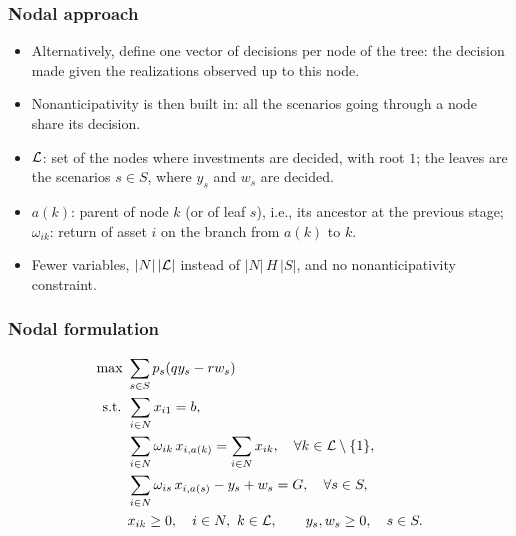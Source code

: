 \documentclass[aspectratio=169]{beamer}
\begin{document}
\begin{frame}
\frametitle{Nodal approach}

\begin{itemize}
\item
Alternatively, define one vector of decisions per node of the tree: the decision made given the realizations observed up to this node.
\item
Nonanticipativity is then built in: all the scenarios going through a node share its decision.
\item
${\mathcal{L}}$: set of the nodes where investments are decided, with root $1$; the leaves are the scenarios $s \in S$, where $y_s$ and $w_s$ are decided.
\item
$a(k)$: parent of node $k$ (or of leaf $s$), i.e., its ancestor at the previous stage; $\omega_{ik}$: return of asset $i$ on the branch from $a(k)$ to $k$.
\item
Fewer variables, $|N|\,|{\mathcal{L}}|$ instead of $|N|\,H\,|S|$, and no nonanticipativity constraint.
\end{itemize}

\end{frame}

\begin{frame}
\frametitle{Nodal formulation}

\begin{align*}
\max\ & \sum_{s \in S} p_s (qy_s - rw_s) \\
\mbox{s.t. } & \sum_{i \in N} x_{i1} = b, \\
& \sum_{i \in N} \omega_{ik}\, x_{i,a(k)} = \sum_{i \in N} x_{ik}, \quad \forall k \in {\mathcal{L}} \setminus \lbrace 1 \rbrace, \\
& \sum_{i \in N} \omega_{is}\, x_{i,a(s)} - y_s + w_s = G, \quad \forall s \in S, \\
& x_{ik} \geq 0, \quad i \in N,\ k \in {\mathcal{L}}, \qquad y_s, w_s \geq 0, \quad s \in S.
\end{align*}

\end{frame}
\end{document}
